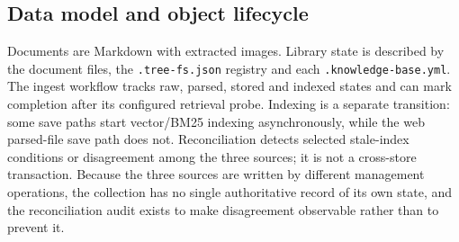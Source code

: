 \subsection{Data model and object lifecycle}
\label{sec:datamodel}
\label{sec:lifecycle}

Documents are Markdown with extracted images. Library state is described by
the document files, the \texttt{.tree-fs.json} registry and each
\texttt{.knowledge-base.yml}. The ingest workflow tracks raw, parsed, stored
and indexed states and can mark completion after its configured retrieval
probe. Indexing is a separate transition: some save paths start vector/BM25
indexing asynchronously, while the web parsed-file save path does not.
Reconciliation detects selected stale-index conditions or disagreement among
the three sources; it is not a cross-store transaction. Because the three
sources are written by different management operations, the collection has no
single authoritative record of its own state, and the reconciliation audit
exists to make disagreement observable rather than to prevent it.
